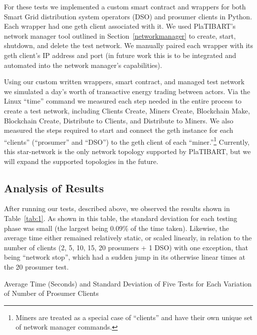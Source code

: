 For these tests we implemented a custom smart contract and wrappers for both Smart Grid distribution system operators (DSO) and prosumer clients in Python. Each wrapper had one geth client associated with it. We used PlaTIBART's network manager tool outlined in Section~\ref{networkmanager} to create, start, shutdown, and delete the test network. We manually paired each wrapper with its geth client's IP address and port (in future work this is to be integrated and automated into the network manager's capabilities).  

Using our custom written wrappers, smart contract, and managed test network we simulated a day's worth of transactive energy trading between actors. Via the Linux ``time'' command we measured each step needed in the entire process to create a test network, including Clients Create, Miners Create, Blockchain Make, Blockchain Create, Distribute to Clients, and Distribute to Miners. We also measured the steps required to start and connect the geth instance for each ``clients'' (``prosumer'' and ``DSO'') to the geth client of each ``miner.''\footnote{Miners are treated as a special case of ``clients'' and have their own unique set of network manager commands.} Currently, this star-network is the only network topology supported by PlaTIBART, but we will expand the supported topologies in the future. 

\subsection{Analysis of Results}
\label{results}
After running our tests, described above, we observed the results shown in Table~\ref{tab:1}. As shown in this table, the standard deviation for each testing phase was small (the largest being 0.09\% of the time taken). Likewise, the average time either remained relatively static, or scaled linearly, in relation to the number of clients (2, 5, 10, 15, 20 prosumers + 1 DSO) with one exception, that being ``network stop'', which had a sudden jump in its otherwise linear times at the 20 prosumer test.

\label{experiment}
\begin{table*}[!htbp]
	\centering
	
	\caption{Average Time (Seconds) and Standard Deviation of Five Tests for Each Variation of Number of Prosumer Clients}
	\label{tab:1}
	\vspace{-0.3in}
\end{table*}

